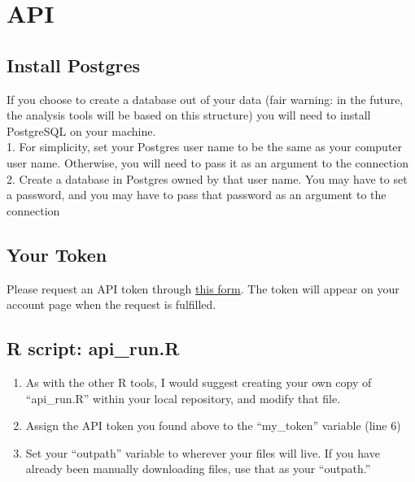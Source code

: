 \documentclass[
]{book}
\providecommand{\tightlist}{%
  \setlength{\itemsep}{0pt}\setlength{\parskip}{0pt}}
\begin{document}
\hypertarget{intro}{%
\chapter{API}\label{intro}}

\hypertarget{install-postgres}{%
\section{Install Postgres}\label{install-postgres}}

If you choose to create a database out of your data (fair warning: in the future, the analysis tools will be based on this structure) you will need to install PostgreSQL on your machine.\\
1. For simplicity, set your Postgres user name to be the same as your computer user name. Otherwise, you will need to pass it as an argument to the connection\\
2. Create a database in Postgres owned by that user name. You may have to set a password, and you may have to pass that password as an argument to the connection

\hypertarget{your-token}{%
\section{Your Token}\label{your-token}}

Please request an API token through \href{https://celltracktech.com/support-radio-api/}{this form}. The token will appear on your account page when the request is fulfilled.

\hypertarget{r-script-api_run.r}{%
\section{R script: api\_run.R}\label{r-script-api_run.r}}

\begin{enumerate}
\def\labelenumi{\arabic{enumi}.}
\tightlist
\item
  As with the other R tools, I would suggest creating your own copy of ``api\_run.R'' within your local repository, and modify that file.
\item
  Assign the API token you found above to the ``my\_token'' variable (line 6)\\
\item
  Set your ``outpath'' variable to wherever your files will live. If you have already been manually downloading files, use that as your ``outpath.''
\end{enumerate}
\end{document}

